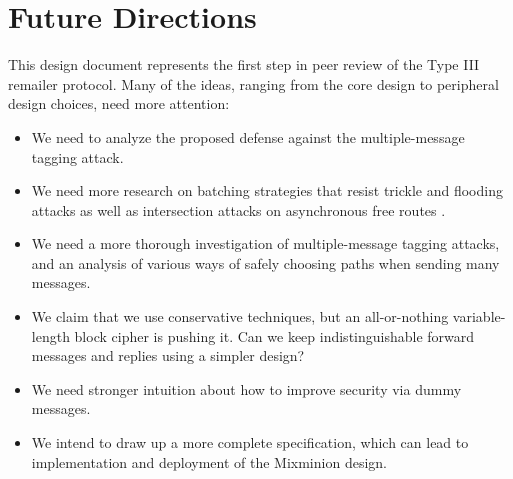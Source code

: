 \documentclass{llncs}
\renewcommand\url{\begingroup \def\UrlLeft{<}\def\UrlRight{>}\urlstyle{tt}\Url}
\begin{document}

\section{Future Directions}
\label{sec:conclusion}

This design document represents the first step in peer review of the
Type III remailer protocol. Many of the ideas, ranging from the core
design to peripheral design choices, need more attention:

\begin{itemize}
\item We need to analyze the proposed defense against the multiple-message
tagging attack.
\item We need more research on batching strategies that resist trickle
and flooding attacks \cite{batching-taxonomy} as well as intersection
attacks on asynchronous free routes \cite{disad-free-routes}.
\item We need a more thorough investigation of multiple-message tagging
attacks, and an analysis of various ways of safely choosing paths when
sending many messages.
\item We claim that we use conservative techniques, but an all-or-nothing
variable-length block cipher is pushing it. Can we keep indistinguishable
forward messages and replies using a simpler design?
\item We need stronger intuition about how to improve security via
dummy messages.
\item We intend to draw up a more complete specification, which can lead
to implementation and deployment of the Mixminion design.
\end{itemize}








\end{document}
